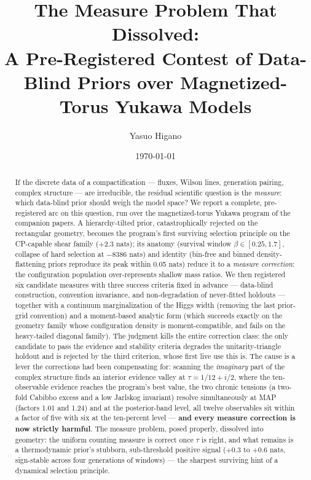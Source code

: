 \documentclass[aps,prd,preprint,nofootinbib]{revtex4-2}
\begin{document}
\title{The Measure Problem That Dissolved:\\
A Pre-Registered Contest of Data-Blind Priors over Magnetized-Torus Yukawa Models}

\author{Yasuo Higano}

\date{\today}

\begin{abstract}
If the discrete data of a compactification --- fluxes, Wilson lines, generation
pairing, complex structure --- are irreducible, the residual scientific
question is the \emph{measure}: which data-blind prior should weigh the model
space? We report a complete, pre-registered arc on this question, run over the
magnetized-torus Yukawa program of the companion papers. A hierarchy-tilted
prior, catastrophically rejected on the rectangular geometry, becomes the
program's first surviving selection principle on the CP-capable shear family
($+2.3$ nats); its anatomy (survival window $\beta\in[0.25,1.7]$, collapse of
hard selection at $-8386$ nats) and identity (bin-free and binned
density-flattening priors reproduce its peak within 0.05 nats) reduce it to a
\emph{measure correction}: the configuration population over-represents shallow
mass ratios. We then registered six candidate measures with three success
criteria fixed in advance --- data-blind construction, convention invariance,
and non-degradation of never-fitted holdouts --- together with a continuum
marginalization of the Higgs width (removing the last prior-grid convention)
and a moment-based analytic form (which succeeds exactly on the geometry family
whose configuration density is moment-compatible, and fails on the heavy-tailed
diagonal family). The judgment kills the entire correction class: the only
candidate to pass the evidence and stability criteria degrades the
unitarity-triangle holdout and is rejected by the third criterion, whose first
live use this is. The cause is a lever the corrections had been compensating
for: scanning the \emph{imaginary} part of the complex structure finds an
interior evidence valley at $\tau=1/12+i/2$, where the ten-observable evidence
reaches the program's best value, the two chronic tensions (a two-fold Cabibbo
excess and a low Jarlskog invariant) resolve simultaneously at MAP (factors
1.01 and 1.24) and at the posterior-band level, all twelve observables sit
within a factor of five with six at the ten-percent level --- \textbf{and every
measure correction is now strictly harmful}. The measure problem, posed
properly, dissolved into geometry: the uniform counting measure is correct once
$\tau$ is right, and what remains is a thermodynamic prior's stubborn,
sub-threshold positive signal ($+0.3$ to $+0.6$ nats, sign-stable across four
generations of windows) --- the sharpest surviving hint of a dynamical
selection principle.
\end{abstract}
\end{document}
